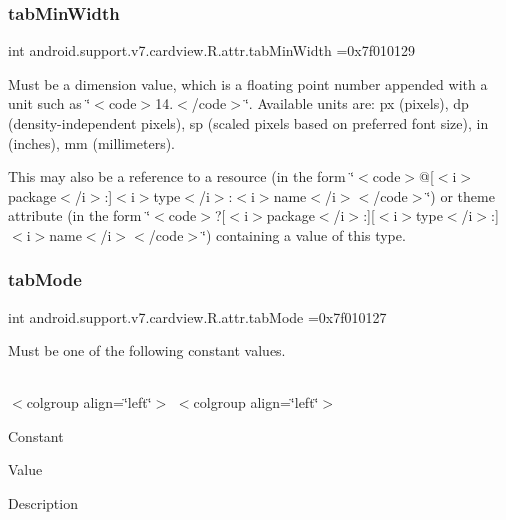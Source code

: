 \subsubsection{\texorpdfstring{tab\+Min\+Width}{tabMinWidth}}
{\footnotesize\ttfamily int android.\+support.\+v7.\+cardview.\+R.\+attr.\+tab\+Min\+Width =0x7f010129\hspace{0.3cm}{\ttfamily [static]}}

Must be a dimension value, which is a floating point number appended with a unit such as \char`\"{}$<$code$>$14.\+5sp$<$/code$>$\char`\"{}. Available units are\+: px (pixels), dp (density-\/independent pixels), sp (scaled pixels based on preferred font size), in (inches), mm (millimeters). 

This may also be a reference to a resource (in the form \char`\"{}$<$code$>$@\mbox{[}$<$i$>$package$<$/i$>$\+:\mbox{]}$<$i$>$type$<$/i$>$\+:$<$i$>$name$<$/i$>$$<$/code$>$\char`\"{}) or theme attribute (in the form \char`\"{}$<$code$>$?\mbox{[}$<$i$>$package$<$/i$>$\+:\mbox{]}\mbox{[}$<$i$>$type$<$/i$>$\+:\mbox{]}$<$i$>$name$<$/i$>$$<$/code$>$\char`\"{}) containing a value of this type. \mbox{\label{classandroid_1_1support_1_1v7_1_1cardview_1_1R_1_1attr_a3c24a77c1c5e85a581ff4d14de5f5b4c}} 
\subsubsection{\texorpdfstring{tab\+Mode}{tabMode}}
{\footnotesize\ttfamily int android.\+support.\+v7.\+cardview.\+R.\+attr.\+tab\+Mode =0x7f010127\hspace{0.3cm}{\ttfamily [static]}}

Must be one of the following constant values.

\tabulinesep=1mm
\begin{longtabu} spread 0pt [c]{*{0}{|X[-1]}|}
\hline
\end{longtabu}
$<$colgroup align=\char`\"{}left\char`\"{}$>$ $<$colgroup align=\char`\"{}left\char`\"{}$>$ 

Constant

Value

Description 


